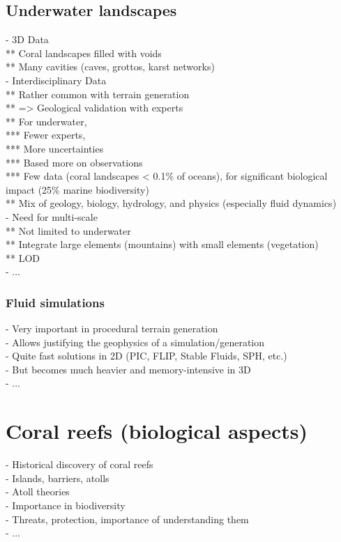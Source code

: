 \subsection{Underwater landscapes}
- 3D Data \\
** Coral landscapes filled with voids \\
** Many cavities (caves, grottos, karst networks) \\
- Interdisciplinary Data \\
** Rather common with terrain generation \\
** => Geological validation with experts \\
** For underwater, \\
*** Fewer experts, \\
*** More uncertainties \\
*** Based more on observations \\
*** Few data (coral landscapes < 0.1\% of oceans), for significant biological impact (25\% marine biodiversity) \\
** Mix of geology, biology, hydrology, and physics (especially fluid dynamics) \\
- Need for multi-scale \\
** Not limited to underwater \\
** Integrate large elements (mountains) with small elements (vegetation) \\
** LOD \\
- ...

\subsubsection{Fluid simulations}
- Very important in procedural terrain generation \\
- Allows justifying the geophysics of a simulation/generation \\
- Quite fast solutions in 2D (PIC, FLIP, Stable Fluids, SPH, etc.) \\
- But becomes much heavier and memory-intensive in 3D \\
- ...

\section{Coral reefs (biological aspects)}
\label{sec:state-of-the-art_biology}
- Historical discovery of coral reefs \\
- Islands, barriers, atolls \\
- Atoll theories \\
- Importance in biodiversity \\
- Threats, protection, importance of understanding them \\
- ...


